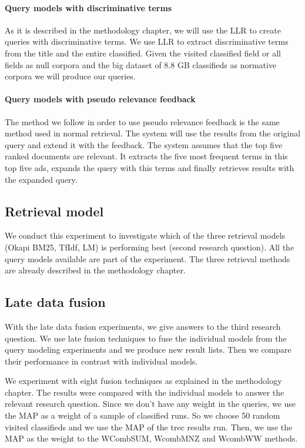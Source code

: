  \paragraph{Query models with discriminative terms}

As it is described in the methodology chapter, we will use the LLR to create queries with discriminative terms. We use LLR to extract discriminative terms from the title and the entire classified. Given the visited classified field or all fields as null corpora and the big dataset of 8.8 GB classifieds as normative corpora we will produce our queries.

 \paragraph{Query models with pseudo relevance feedback}

The method we follow in order to use pseudo relevance feedback is the same method used in normal retrieval. The system will use the results from the original query and extend it with the feedback. The system assumes that the top five ranked documents are relevant. It extracts the five most frequent terms in this top five ads, expands the query with this terms and finally retrieves results with the expanded query.



\subsection{Retrieval model}
We conduct this experiment to investigate which of the three retrieval models (Okapi BM25, TfIdf, LM) is performing best (second research question). All the query models available are part of the experiment. The three retrieval methods are already described in the methodology chapter.


\subsection{Late data fusion}

With the late data fusion experiments, we give answers to the third research question. We use late fusion techniques to fuse the individual models from the query modeling experiments and we produce new result lists. Then we compare their performance in contrast with individual models.


We experiment with eight fusion techniques as explained in the methodology chapter. The results were compared with the individual models to answer the relevant research question. Since we don't have any weight in the queries, we use the MAP as a weight of a sample of classified runs. So we choose 50 random visited classifieds and we use the MAP of the trec results run. Then, we use the MAP as the weight to the WCombSUM, WcombMNZ and WcombWW methods.

